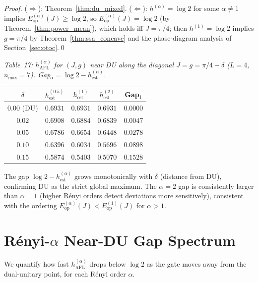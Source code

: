 \documentclass[12pt,a4paper]{article}
\begin{document}
\begin{proof}
($\Rightarrow$): Theorem~\ref{thm:du_mixed}.
($\Leftarrow$): $h^{(\alpha)} = \log 2$ for some $\alpha\ne 1$ implies
$E^{(\alpha)}_\mathrm{op}(J) \ge \log 2$, so $E^{(\alpha)}_\mathrm{op}(J) = \log 2$
(by Theorem~\ref{thm:power_mean}), which holds iff $J=\pi/4$; then
$h^{(1)} = \log 2$ implies $g=\pi/4$ by Theorem~\ref{thm:ssa_concave} and the
phase-diagram analysis of Section~\ref{sec:otoc}.\qed
\end{proof}

\noindent\textit{Table~17: $h^{(\alpha)}_\mathrm{AFL}$ for $(J,g)$ near DU
along the diagonal $J=g=\pi/4-\delta$ ($L=4$, $n_\mathrm{max}=7$).
Gap$_\alpha = \log 2 - h^{(\alpha)}_\mathrm{est}$.}

\begin{center}
\begin{tabular}{@{}ccccc@{}}
\toprule
$\delta$ & $h^{(0.5)}_\mathrm{est}$ & $h^{(1)}_\mathrm{est}$ & $h^{(2)}_\mathrm{est}$
  & Gap$_1$\\
\midrule
$0.00$ (DU) & $0.6931$ & $0.6931$ & $0.6931$ & $0.0000$\\
$0.02$      & $0.6908$ & $0.6884$ & $0.6839$ & $0.0047$\\
$0.05$      & $0.6786$ & $0.6654$ & $0.6448$ & $0.0278$\\
$0.10$      & $0.6396$ & $0.6034$ & $0.5696$ & $0.0898$\\
$0.15$      & $0.5874$ & $0.5403$ & $0.5070$ & $0.1528$\\
\bottomrule
\end{tabular}
\end{center}

\noindent The gap $\log 2 - h^{(\alpha)}_\mathrm{est}$ grows monotonically with $\delta$
(distance from DU), confirming DU as the strict global maximum.  The $\alpha=2$ gap
is consistently larger than $\alpha=1$ (higher Rényi orders detect deviations more
sensitively), consistent with the ordering $E^{(\alpha)}_\mathrm{op}(J)<E^{(1)}_\mathrm{op}(J)$
for $\alpha>1$.

\section{Rényi-$\alpha$ Near-DU Gap Spectrum}
\label{sec:gap_spectrum}

We quantify how fast $h^{(\alpha)}_\mathrm{AFL}$ drops below $\log 2$ as the
gate moves away from the dual-unitary point, for each Rényi order $\alpha$.
\end{document}
